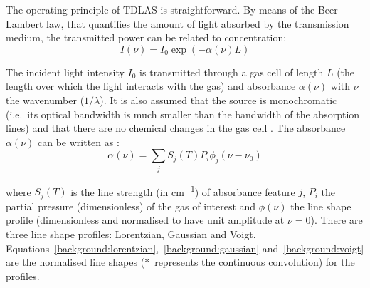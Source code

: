 \documentclass[\home/main.tex]{subfiles}
\begin{document}
  The operating principle of \acrshort{TDLAS} is straightforward. By means of the Beer-Lambert law, that quantifies the amount of light absorbed by the transmission medium, the transmitted power can be related to concentration:
  \begin{equation}
    I(\nu) = I_0 \exp(-\alpha(\nu)L)
    \label{background:Beer-Lambert-law}
  \end{equation}

  The incident light intensity $I_0$ is transmitted through a gas cell of length $L$ (the length over which the light interacts with the gas) and absorbance $\alpha(\nu)$ with $\nu$ the wavenumber ($1/\lambda$). It is also assumed that the source is monochromatic (i.e.\ its optical bandwidth is much smaller than the bandwidth of the absorption lines) and that there are no chemical changes in the gas cell \cite{abs-spec-status-and-potential}. The absorbance $\alpha(\nu)$ can be written as \cite{RiekerDissertation}:%
  \begin{equation}
    \alpha(\nu) = \sum_j S_j(T) P_i \phi_j(\nu-\nu_0)
    \label{background:absorption-coefficient}
  \end{equation}

  where $S_j(T)$ is the line strength (in \si{\centi\metre^{-1}}) of absorbance feature $j$, $P_i$ the partial pressure (dimensionless) of the gas of interest and $\phi(\nu)$ the line shape profile (dimensionless and normalised to have unit amplitude at $\nu=0$). There are three line shape profiles: Lorentzian, Gaussian and Voigt. Equations~\ref{background:lorentzian},~\ref{background:gaussian} and~\ref{background:voigt}
  are the normalised line shapes ($*$~represents the continuous convolution) for the profiles.
    
   
\end{document}
